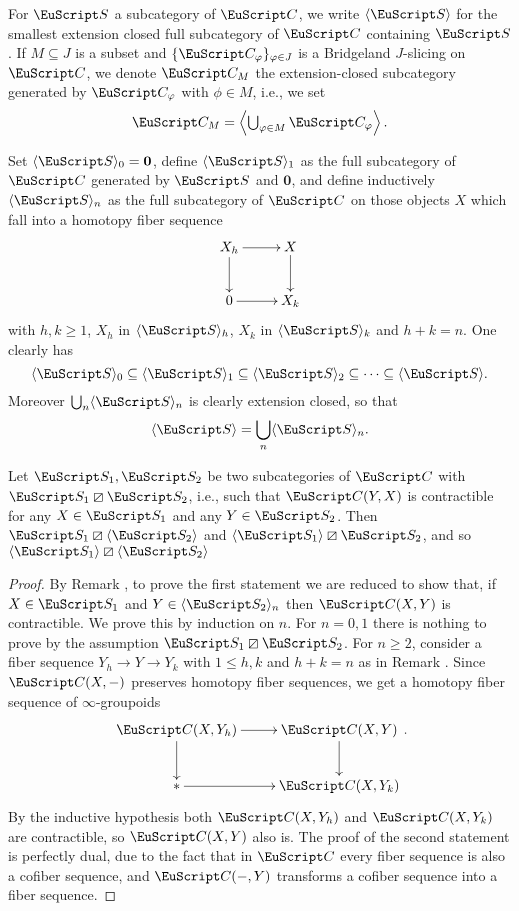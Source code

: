 \begin{notat}\label{notation.bridg-slicing}
For $\cate{S}$ a subcategory of $\C$, we write $\langle \cate{S}\rangle$ for the smallest extension closed full subcategory of $\C$ containing $\cate{S}$. 
If $M \subseteq J$ is a subset and $\{ \C_{\phi} \}_{\phi \in J}$ is a Bridgeland $J$-slicing on $\C$, we denote $\C_M$ the extension-closed subcategory generated by $\C_{\phi}$ with $\phi \in M$, i.e., we set 
\[
\textstyle \C_M=\left\langle \bigcup_{\phi\in M}\C_\phi \right\rangle.
\]
\end{notat}
\begin{remark}\label{extensions}
Set  $\langle \cate{S}\rangle_0=\mathbf{0}$,  define $\langle \cate{S}\rangle_1$ as the full subcategory of $\C$ generated by $\cate{S}$ and $\mathbf{0}$, and define inductively $\langle \cate{S}\rangle_n$ as the full subcategory of $\C$ on those objects $X$ which fall into a homotopy fiber sequence
\[
\xymatrix{
X_h\ar[r]\ar[d]& X\ar[d]\\
0\ar[r] &X_k
}
\]
with $h,k\geq 1$, $X_h$ in $\langle \cate{S}\rangle_h$, $X_k$ in $\langle \cate{S}\rangle_k$ and $h+k=n$. One clearly has 
\[
\langle \cate{S}\rangle_0\subseteq \langle \cate{S}\rangle_1 \subseteq \langle \cate{S}\rangle_2\subseteq\cdots \subseteq \langle \cate{S}\rangle.
\]
Moreover $\bigcup_n \langle \cate{S}\rangle_n$ is clearly extension closed, so that
\[
\langle \cate{S}\rangle =\bigcup_n \langle \cate{S}\rangle_n.
\] 
\end{remark}
\begin{lemma}\label{closure}
Let $\cate{S}_1,\cate{S}_2$ be two subcategories of $\C$ with $\cate{S}_1\orth \cate{S}_2$, i.e., such that $\C(Y,X)$ is contractible for any $X\in \cate{S}_1$ and any $Y\in\cate{S}_2$. Then $\cate{S}_1\orth \langle\cate{S}_2\rangle$ and $\langle\cate{S}_1\rangle\orth \cate{S}_2$, and so $\langle\cate{S}_1\rangle\orth \langle\cate{S}_2\rangle$
\end{lemma}
\begin{proof}
By Remark , to prove the first statement we are reduced to show that, if $X\in \cate{S}_1$ and $Y\in \langle\cate{S}_2\rangle_n$ then $\C(X,Y)$ is contractible. We prove this by induction on $n$. For $n=0,1$ there is nothing to prove by the assumption $\cate{S}_1\orth \cate{S}_2$. For $n\geq 2$, consider a fiber sequence $Y_h\to Y\to Y_k$ with $1\leq h,k$ and $h+k=n$ as in Remark . Since $\C(X,-)$ preserves homotopy fiber sequences, we get a homotopy fiber sequence of $\infty$-groupoids
\[
\xymatrix{
\C(X,Y_h)\ar[r]\ar[d]& \C(X,Y)\ar[d]\\
{*}\ar[r] &\C(X,Y_k)
}.
\]
By the inductive hypothesis both $\C(X,Y_h)$ and $\C(X,Y_k)$ are contractible, so $\C(X,Y)$ also is. The proof of the second statement is perfectly dual, due to the fact that in $\C$ every fiber sequence is also a cofiber sequence, and $\C(-,Y)$ transforms a cofiber sequence into a fiber sequence.
\end{proof}
